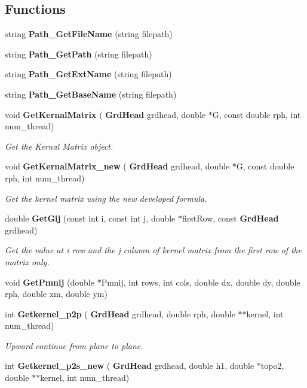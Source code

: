 \subsection*{Functions}
\begin{DoxyCompactItemize}
\item 
string \textbf{ Path\+\_\+\+Get\+File\+Name} (string filepath)
\item 
string \textbf{ Path\+\_\+\+Get\+Path} (string filepath)
\item 
string \textbf{ Path\+\_\+\+Get\+Ext\+Name} (string filepath)
\item 
string \textbf{ Path\+\_\+\+Get\+Base\+Name} (string filepath)
\item 
void \textbf{ Get\+Kernal\+Matrix} (\textbf{ Grd\+Head} grdhead, double $\ast$G, const double rph, int num\+\_\+thread)
\begin{DoxyCompactList}\small\item\em Get the Kernal Matrix object. \end{DoxyCompactList}\item 
void \textbf{ Get\+Kernal\+Matrix\+\_\+new} (\textbf{ Grd\+Head} grdhead, double $\ast$G, const double rph, int num\+\_\+thread)
\begin{DoxyCompactList}\small\item\em Get the kernel matrix using the new developed formula. \end{DoxyCompactList}\item 
double \textbf{ Get\+Gij} (const int i, const int j, double $\ast$first\+Row, const \textbf{ Grd\+Head} grdhead)
\begin{DoxyCompactList}\small\item\em Get the value at i row and the j column of kernel matrix from the first row of the matrix only. \end{DoxyCompactList}\item 
void \textbf{ Get\+Pmnij} (double $\ast$Pmnij, int rows, int cols, double dx, double dy, double rph, double xm, double ym)
\item 
int \textbf{ Getkernel\+\_\+p2p} (\textbf{ Grd\+Head} grdhead, double rph, double $\ast$$\ast$kernel, int num\+\_\+thread)
\begin{DoxyCompactList}\small\item\em Upward continue from plane to plane. \end{DoxyCompactList}\item 
int \textbf{ Getkernel\+\_\+p2s\+\_\+new} (\textbf{ Grd\+Head} grdhead, double h1, double $\ast$topo2, double $\ast$$\ast$kernel, int num\+\_\+thread)

\end{DoxyCompactItemize}
